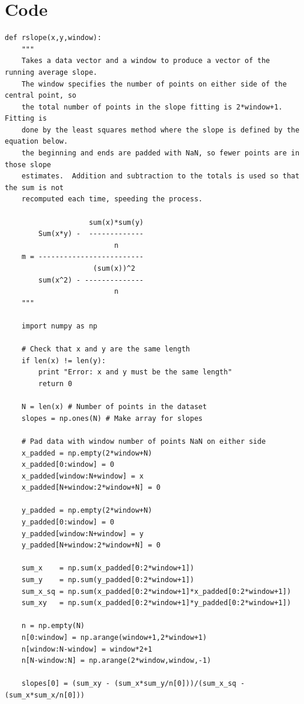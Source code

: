 \documentclass[a4paper,11pt,oneside]{article}
\begin{document}
\newpage

\section{Code}
\begin{lstlisting}
def rslope(x,y,window):
    """
    Takes a data vector and a window to produce a vector of the running average slope.
    The window specifies the number of points on either side of the central point, so
    the total number of points in the slope fitting is 2*window+1.  Fitting is 
    done by the least squares method where the slope is defined by the equation below.
    the beginning and ends are padded with NaN, so fewer points are in those slope 
    estimates.  Addition and subtraction to the totals is used so that the sum is not
    recomputed each time, speeding the process.
    
                    sum(x)*sum(y)
        Sum(x*y) -  -------------
                          n
    m = -------------------------
                     (sum(x))^2
        sum(x^2) - --------------
                          n
    """
    
    import numpy as np
    
    # Check that x and y are the same length
    if len(x) != len(y): 
        print "Error: x and y must be the same length"
        return 0     
    
    N = len(x) # Number of points in the dataset
    slopes = np.ones(N) # Make array for slopes
    
    # Pad data with window number of points NaN on either side
    x_padded = np.empty(2*window+N)
    x_padded[0:window] = 0
    x_padded[window:N+window] = x
    x_padded[N+window:2*window+N] = 0
    
    y_padded = np.empty(2*window+N)
    y_padded[0:window] = 0
    y_padded[window:N+window] = y
    y_padded[N+window:2*window+N] = 0
    
    sum_x    = np.sum(x_padded[0:2*window+1])
    sum_y    = np.sum(y_padded[0:2*window+1])
    sum_x_sq = np.sum(x_padded[0:2*window+1]*x_padded[0:2*window+1])
    sum_xy   = np.sum(x_padded[0:2*window+1]*y_padded[0:2*window+1])

    n = np.empty(N)
    n[0:window] = np.arange(window+1,2*window+1)
    n[window:N-window] = window*2+1
    n[N-window:N] = np.arange(2*window,window,-1)
    
    slopes[0] = (sum_xy - (sum_x*sum_y/n[0]))/(sum_x_sq - (sum_x*sum_x/n[0]))
    

\end{lstlisting}
\end{document}
